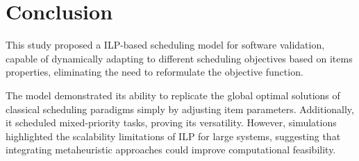 \documentclass[12pt]{article}
\begin{document}
\section*{Conclusion}

This study proposed a ILP-based scheduling model for software validation, capable of dynamically adapting to different scheduling objectives based on items properties, eliminating the need to reformulate the objective function.

The model demonstrated its ability to replicate the global optimal solutions of classical scheduling paradigms simply by adjusting item parameters. Additionally, it scheduled mixed-priority tasks, proving its versatility. However, simulations highlighted the scalability limitations of ILP for large systems, suggesting that integrating metaheuristic approaches could improve computational feasibility.








\end{document}
